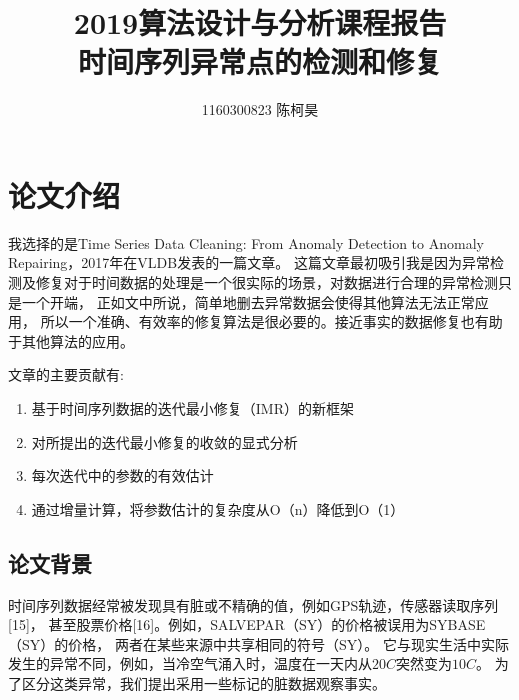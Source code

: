 \documentclass[12pt,a4paper]{article}
\title{2019算法设计与分析课程报告  \\ 时间序列异常点的检测和修复}
\author{1160300823  陈柯昊}
\begin{document}
\maketitle
\section{论文介绍}
我选择的是Time Series Data Cleaning: From Anomaly Detection to Anomaly Repairing，2017年在VLDB发表的一篇文章。
这篇文章最初吸引我是因为异常检测及修复对于时间数据的处理是一个很实际的场景，对数据进行合理的异常检测只是一个开端，
正如文中所说，简单地删去异常数据会使得其他算法无法正常应用，
所以一个准确、有效率的修复算法是很必要的。接近事实的数据修复也有助于其他算法的应用。
\par
文章的主要贡献有:
\begin{enumerate}
 \item 基于时间序列数据的迭代最小修复（IMR）的新框架
 \item 对所提出的迭代最小修复的收敛的显式分析
 \item 每次迭代中的参数的有效估计
 \item 通过增量计算，将参数估计的复杂度从O（n）降低到O（1）   
\end{enumerate}
\subsection{论文背景}
时间序列数据经常被发现具有脏或不精确的值，例如GPS轨迹，传感器读取序列[15]，
甚至股票价格[16]。例如，SALVEPAR（SY）的价格被误用为SYBASE（SY）的价格，
两者在某些来源中共享相同的符号（SY）。
它与现实生活中实际发生的异常不同，例如，当冷空气涌入时，温度在一天内从$20C$突然变为$10C$。
为了区分这类异常，我们提出采用一些标记的脏数据观察事实。
\end{document}
